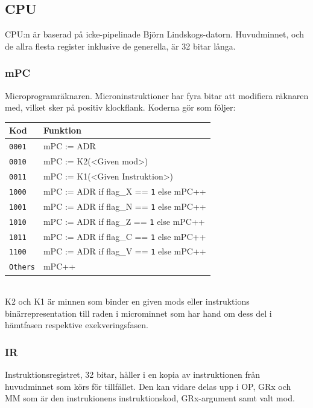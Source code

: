 \documentclass[]{article}
\begin{document}
\subsection{CPU}

CPU:n är baserad på icke-pipelinade Björn Lindskogs-datorn. Huvudminnet, och de allra flesta register inklusive de generella, är 32 bitar långa.

\subsubsection{mPC}

Microprogramräknaren. Microninstruktioner har fyra bitar att modifiera räknaren med, vilket sker på positiv klockflank. Koderna gör som följer:
\\

\begin{tabular}{ll}
	\textbf{Kod}    & \textbf{Funktion}                              \\ \hline
	\texttt{0001}   & mPC := ADR                                     \\
	\texttt{0010}   & mPC := K2(<Given mod>)                         \\
	\texttt{0011}   & mPC := K1(<Given Instruktion>)                 \\
	\texttt{1000}   & mPC := ADR if flag\_X == \texttt{1} else mPC++ \\
	\texttt{1001}   & mPC := ADR if flag\_N == \texttt{1} else mPC++ \\
	\texttt{1010}   & mPC := ADR if flag\_Z == \texttt{1} else mPC++ \\
	\texttt{1011}   & mPC := ADR if flag\_C == \texttt{1} else mPC++ \\
	\texttt{1100}   & mPC := ADR if flag\_V == \texttt{1} else mPC++ \\
	\texttt{Others} & mPC++
\end{tabular}
\\

\noindent
K2 och K1 är minnen som binder en given mods eller instruktions binärrepresentation till raden i microminnet som har hand om dess del i hämtfasen respektive exekveringsfasen.

\subsubsection{IR}

Instruktionsregistret, 32 bitar, håller i en kopia av instruktionen från huvudminnet som körs för tillfället. Den kan vidare delas upp i OP, GRx och MM som är den instrukionens instruktionskod, GRx-argument samt valt mod.
\end{document}
